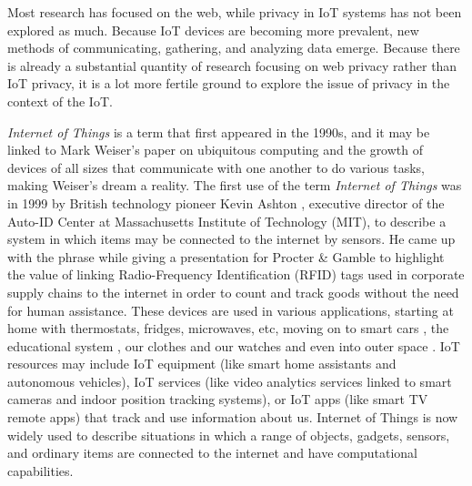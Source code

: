 \documentclass[conference]{IEEEtran}
\begin{document}
Most research has focused on the web, while privacy in IoT systems has not
been explored as much. Because IoT devices are becoming more prevalent,
new methods of communicating, gathering, and analyzing data emerge.
Because there is already a substantial quantity of research focusing on
web privacy rather than IoT privacy, it is a lot more fertile ground to
explore the issue of privacy in the context of the IoT.

\textit{Internet of Things} is a term that first appeared in the 1990s,
and it may be linked to Mark Weiser's paper on ubiquitous computing \cite{weiser1991computer}
and the growth of devices of all sizes that communicate with one another
to do various tasks, making Weiser's dream a reality. The first use of the
term \textit{Internet of Things} was in 1999 by British technology pioneer
Kevin Ashton \cite{KevinThat}, executive director of the Auto-ID Center
at Massachusetts Institute of Technology (MIT), to describe a system in
which items may be connected to the internet by sensors. He came up with
the phrase while giving a presentation for Procter \& Gamble to highlight
the value of linking Radio-Frequency Identification (RFID) tags used in
corporate supply chains to the internet in order to count and track goods
without the need for human assistance. These devices are used in various
applications, starting at home \cite{marikyan2019systematic} with thermostats,
fridges, microwaves, etc, moving on to smart cars \cite{arena2020overview},
the educational system \cite{al2020survey}, our clothes and our watches \cite{niknejad2020comprehensive}
and even into outer space \cite{AkyildizInternet}. IoT resources may include
IoT equipment (like smart home assistants and autonomous vehicles), IoT
services (like video analytics services linked to smart cameras and indoor
position tracking systems), or IoT apps (like smart TV remote apps) that
track and use information about us. Internet of Things is now widely used
to describe situations in which a range of objects, gadgets, sensors, and
ordinary items are connected to the internet and have computational capabilities.
\end{document}
